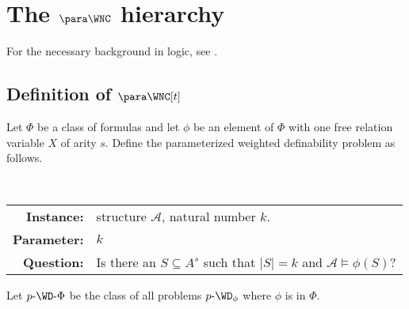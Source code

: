 \section{The \texorpdfstring{$\para \WNC$}{paraWNC} hierarchy}

For the necessary background in logic, see \autocite[Chapter~4]{fg06}.

\subsection{Definition of \texorpdfstring{$\para \WNC[t]$}{paraWNC[t]}}

Let $\Phi$ be a class of formulas and let $\phi$ be an element of $\Phi$ with one free relation variable $X$ of arity $s$.
Define the parameterized weighted definability problem as follows.


\begin{definition}
  \mbox{} \\
  \begin{tabular}{r p{9.2cm}}
    \textbf{Instance:} & structure $\mathcal{A}$, natural number $k$. \\
    \textbf{Parameter:} & $k$ \\
    \textbf{Question:} & Is there an $S \subseteq A^s$ such that $|S| = k$ and $\mathcal{A} \models \phi(S)$?
  \end{tabular}
\end{definition}

Let $p \dash \WD \dash \Phi$ be the class of all problems $p \dash \WD_\phi$ where $\phi$ is in $\Phi$.



